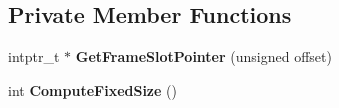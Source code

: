 \subsection*{Private Member Functions}
\begin{DoxyCompactItemize}
\item 
intptr\+\_\+t $\ast$ {\bfseries Get\+Frame\+Slot\+Pointer} (unsigned offset)\hypertarget{classv8_1_1internal_1_1_frame_description_a6fb21141d3fe22cf31e55a070b0ef7ff}{}\label{classv8_1_1internal_1_1_frame_description_a6fb21141d3fe22cf31e55a070b0ef7ff}

\item 
int {\bfseries Compute\+Fixed\+Size} ()\hypertarget{classv8_1_1internal_1_1_frame_description_a50e3fedd655920749dd05270fda8e3e2}{}\label{classv8_1_1internal_1_1_frame_description_a50e3fedd655920749dd05270fda8e3e2}

\end{DoxyCompactItemize}
